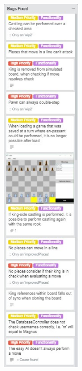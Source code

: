 \documentclass{article}
\begin{document}
\includegraphics[width=4cm]{20180510-bugsfixed1.jpg}
\end{document}

